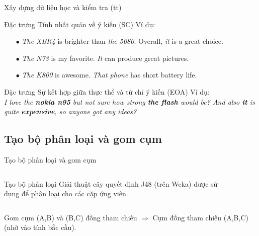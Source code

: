 \documentclass[9pt,xcolor=table,hyperref=unicode]{beamer}
\begin{document}
	\begin{frame}{Xây dựng dữ liệu học và kiểm tra (tt)}
		\begin{block}{Đặc trưng Tính nhất quán về ý kiến (SC)}			
			Ví dụ:\\
			\begin{itemize}
				\item[$\bullet$]{\textit{The XBR4} is brighter than \textit{the 5080}. Overall, \textit{it} is a great choice.}
				\item[$\bullet$]{\textit{The N73} is my favorite. \textit{It} can produce great pictures.}
				\item[$\bullet$]{\textit{The K800} is awesome. \textit{That phone} has short battery life.}
			\end{itemize}									
		\end{block}	
		\begin{block}{Đặc trưng Sự kết hợp giữa thực thể và từ chỉ ý kiến (EOA)}			
			Ví dụ:\\
			\textit{I love the \textbf{nokia n95} but not sure how strong \textbf{the flash} would be? And also \textbf{it} is quite \textbf{expensive}, so anyone got any ideas?}			
		\end{block}			
	\end{frame}	

	\subsection{Tạo bộ phân loại và gom cụm}
	\begin{frame}{Tạo bộ phân loại và gom cụm}		
		\begin{columns}[t]
			\begin{column}{0.4\textwidth}
			   	\begin{block}{Tạo bộ phân loại}
					Giải thuật cây quyết định J48 (trên Weka) được sử dụng để phân loại cho các cặp ứng viên.
				\end{block}				
			\end{column}
			\begin{column}{0.6\textwidth}  %
			 	\begin{figure}[H]
					\LARGE 
					\centering				
					\resizebox{65mm}{!}{}	
				\end{figure}
			\end{column}
		\end{columns}
		\begin{columns}[t]
			\begin{column}{\textwidth}
			   	\begin{block}{Gom cụm}
			   		(A,B) và (B,C) đồng tham chiếu $\Rightarrow$ Cụm đồng tham chiếu (A,B,C) (nhờ vào tính bắc cầu).
				\end{block}					
			\end{column}			
		\end{columns}
	\end{frame}
\end{document}
